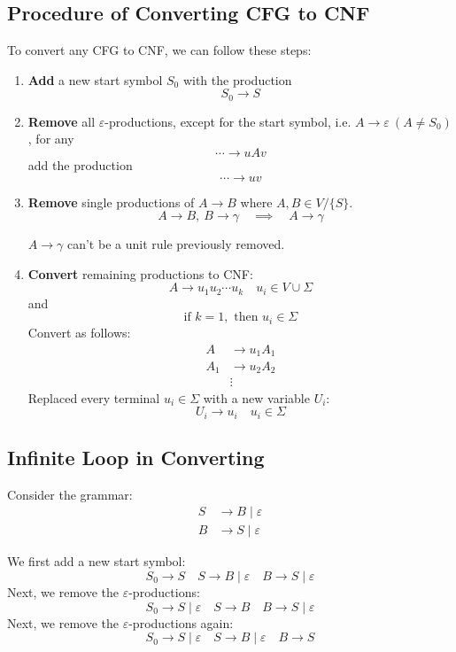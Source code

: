 \subsection{Procedure of Converting CFG to CNF}
To convert any CFG to CNF, we can follow these steps:
\begin{enumerate}[label=$\arabic*^\circ$]
    \item \textbf{Add} a new start symbol \(S_0\) with the production \[S_0 \to S\]
    \item \textbf{Remove} all \(\varepsilon\)-productions, except for the start symbol, i.e. \(A \to \varepsilon \ (A \neq S_0)\), for any 
    \[
        \cdots \to uAv
    \]
    add the production
    \[
        \cdots \to u v
    \]
    \item \textbf{Remove} single productions of $A \to B$ where \(A, B \in V/\{S\} \). 
    \[
        A \to B, \ B \to \gamma \quad \implies \quad A \to \gamma
    \]
    \begin{remark}
        $A \to \gamma$ can't be a unit rule previously removed.
    \end{remark}
    \item \textbf{Convert} remaining productions to CNF:
    \[
        A \to u_1 u_2 \cdots u_k \quad u_i \in V \cup \Sigma
    \]
    and
    \[
        \text{if } k = 1, \text{ then } u_i \in \Sigma
    \]
    Convert as follows:
    \begin{align*}
        A &\to u_1 A_1 \\
        A_1 &\to u_2 A_2 \\
        &\vdots
    \end{align*}
    Replaced every terminal \(u_i \in \Sigma\) with a new variable \(U_i\):
    \[
        U_i \to u_i \quad u_i \in \Sigma
    \]
\end{enumerate}

\subsection{Infinite Loop in Converting}
\begin{eg}
    Consider the grammar:
    \begin{align*}
        S &\to B \mid \varepsilon \\
        B &\to S \mid \varepsilon
    \end{align*}
\end{eg}

We first add a new start symbol:
\[
    S_0 \to S \quad S \to B \mid \varepsilon \quad B \to S \mid \varepsilon
\]
Next, we remove the \(\varepsilon\)-productions:
\[
    S_0 \to S \mid \varepsilon \quad S \to B \quad B \to S \mid \varepsilon
\]
Next, we remove the \(\varepsilon\)-productions again:
\[
    S_0 \to S \mid \varepsilon \quad S \to B \mid \varepsilon \quad B \to S
\]

